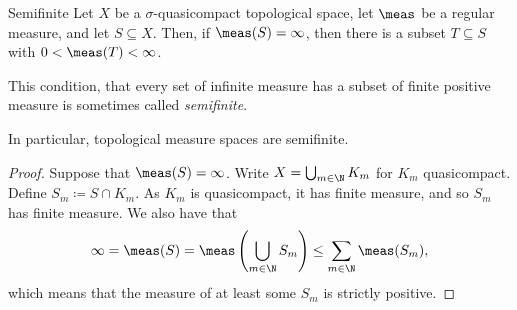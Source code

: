 \begin{prp}{}{Semifinite}
Let $X$ be a $\sigma$-quasicompact topological space, let $\meas$ be a regular measure, and let $S\subseteq X$.  Then, if $\meas (S)=\infty$, then there is a subset $T\subseteq S$ with $0<\meas (T)<\infty$.
\begin{rmk}
This condition, that every set of infinite measure has a subset of finite positive measure is sometimes called \emph{semifinite}.
\end{rmk}
\begin{rmk}
In particular, topological measure spaces are semifinite.
\end{rmk}
\begin{proof}
Suppose that $\meas (S)=\infty$.  Write $X=\bigcup _{m\in \N}K_m$ for $K_m$ quasicompact.  Define $S_m\coloneqq S\cap K_m$.  As $K_m$ is quasicompact, it has finite measure, and so $S_m$ has finite measure.  We also have that
\begin{equation}
\infty =\meas (S)=\meas \left( \bigcup _{m\in \N}S_m\right) \leq \sum _{m\in \N}\meas (S_m),
\end{equation}
which means that the measure of at least some $S_m$ is strictly positive.
\end{proof}
\end{prp}
